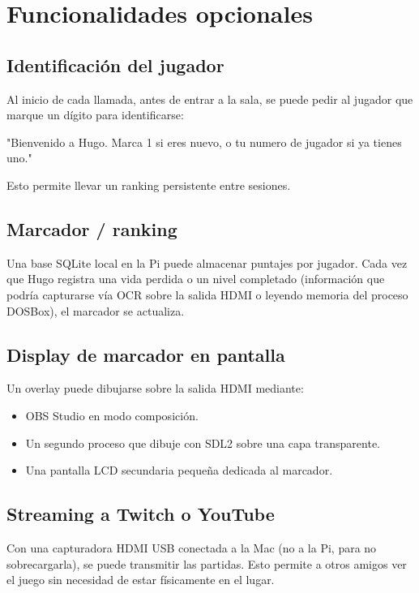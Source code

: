 \section{Funcionalidades opcionales}

\subsection{Identificación del jugador}

Al inicio de cada llamada, antes de entrar a la sala, se puede pedir al jugador que marque un dígito para identificarse:

\begin{plaincode}
"Bienvenido a Hugo. Marca 1 si eres nuevo, o tu numero de jugador
si ya tienes uno."
\end{plaincode}

Esto permite llevar un ranking persistente entre sesiones.

\subsection{Marcador / ranking}

Una base SQLite local en la Pi puede almacenar puntajes por jugador. Cada vez que Hugo registra una vida perdida o un nivel completado (información que podría capturarse vía OCR sobre la salida HDMI o leyendo memoria del proceso DOSBox), el marcador se actualiza.

\subsection{Display de marcador en pantalla}

Un overlay puede dibujarse sobre la salida HDMI mediante:

\begin{itemize}
  \item OBS Studio en modo composición.
  \item Un segundo proceso que dibuje con SDL2 sobre una capa transparente.
  \item Una pantalla LCD secundaria pequeña dedicada al marcador.
\end{itemize}

\subsection{Streaming a Twitch o YouTube}

Con una capturadora HDMI USB conectada a la Mac (no a la Pi, para no sobrecargarla), se puede transmitir las partidas. Esto permite a otros amigos ver el juego sin necesidad de estar físicamente en el lugar.

